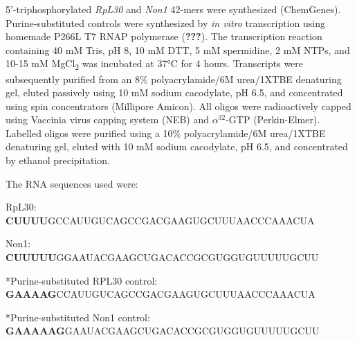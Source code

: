 \documentclass[12pt,oneside]{reedthesis}
\begin{document}
5'-triphosphorylated \emph{RpL30} and \emph{Non1} 42-mers were synthesized (ChemGenes). Purine-substituted controls were synthesized by \emph{in vitro} transcription using homemade P266L T7 RNAP polymerase ({\textbf{???}}). The transcription reaction containing 40 mM Tris, pH 8, 10 mM DTT, 5 mM spermidine, 2 mM NTPs, and 10-15 mM MgCl\textsubscript{2} was incubated at 37°C for 4 hours. Transcripts were subsequently purified from an 8\% polyacrylamide/6M urea/1XTBE denaturing gel, eluted passively using 10 mM sodium cacodylate, pH 6.5, and concentrated using spin concentrators (Millipore Amicon). All oligos were radioactively capped using Vaccinia virus capping system (NEB) and \(\alpha^{32}\)-GTP (Perkin-Elmer). Labelled oligos were purified using a 10\% polyacrylamide/6M urea/1XTBE denaturing gel, eluted with 10 mM sodium cacodylate, pH 6.5, and concentrated by ethanol precipitation.

The RNA sequences used were:

RpL30:
\textbf{\\
}
\textbf{CUUUU}GCCAUUGUCAGCCGACGAAGUGCUUUAACCCAAACUA

Non1:
\textbf{\\
}
\textbf{CUUUUU}GGAAUACGAAGCUGACACCGCGUGGUGUUUUUGCUU

*Purine-substituted RPL30 control:
\textbf{\\
}
\textbf{GAAAAG}CCAUUGUCAGCCGACGAAGUGCUUUAACCCAAACUA

*Purine-substituted Non1 control:
\textbf{\\
}
\textbf{GAAAAAG}GAAUACGAAGCUGACACCGCGUGGUGUUUUUGCUU

\end{document}
